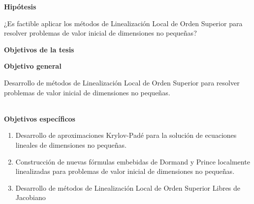 \newpage

\begin{center}
	{\large \textbf{Hipótesis}}
\end{center}
¿Es factible aplicar los métodos de Linealización Local de Orden Superior para resolver problemas de valor inicial de dimensiones no pequeñas?

\qquad

\begin{center}
	{\large \textbf{Objetivos de la tesis}}
\end{center}
\textbf{Objetivo general}

Desarrollo de métodos de Linealización Local de Orden Superior para resolver problemas de valor inicial de dimensiones no pequeñas.

\qquad\\
\textbf{Objetivos específicos}

\begin{enumerate}
	\item Desarrollo de aproximaciones Krylov-Padé para la solución de ecuaciones lineales de dimensiones no pequeñas.
	\item Construcción de nuevas fórmulas embebidas de Dormand y Prince localmente linealizadas para problemas de valor inicial de dimensiones no pequeñas.
	\item Desarrollo de métodos de Linealización Local de Orden Superior Libres de Jacobiano
\end{enumerate}
